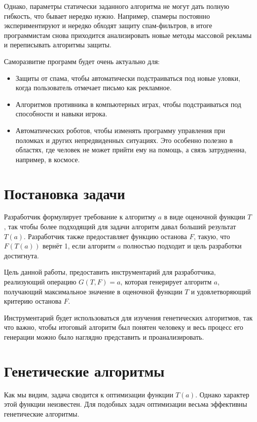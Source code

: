 \documentclass[a4paper,14pt]{extarticle}
\begin{document}
Однако, параметры статически заданного алгоритма не могут дать полную гибкость,
что бывает нередко нужно. Например, спамеры постоянно экспериментируют и нередко
обходят защиту спам-фильтров, в итоге программистам снова приходится
анализировать новые методы массовой рекламы и переписывать алгоритмы защиты.

Саморазвитие программ будет очень актуально для:
\begin{itemize}
  \item Защиты от спама, чтобы автоматически подстраиваться под новые уловки,
        когда пользователь отмечает письмо как рекламное.
  \item Алгоритмов противника в компьютерных играх, чтобы подстраиваться под
        способности и навыки игрока.
  \item Автоматических роботов, чтобы изменять программу управления при
        поломках и других непредвиденных ситуациях.\cite{damage} Это особенно
        полезно в областях, где человек не может прийти ему на помощь, а связь
        затрудненна, например, в космосе.
\end{itemize}

\section{Постановка задачи}
Разработчик формулирует требование к алгоритму $a$ в виде оценочной
функции $T$, так чтобы более подходящий для задачи алгоритм давал больший
результат $T(a)$. Разработчик также предоставляет функцию останова $F$, такую,
что $F(T(a))$ вернёт 1, если алгоритм $a$ полностью подходит и цель разработки
достигнута.

Цель данной работы, предоставить инструментарий для разработчика, реализующий
операцию $G(T, F) = a$, которая генерирует алгоритм $a$, получающий максимальное
значение в оценочной функции $T$ и удовлетворяющий критерию останова $F$.

Инструментарий будет использоваться для изучения генетических алгоритмов, так
что важно, чтобы итоговый алгоритм был понятен человеку и весь процесс его
генерации можно было наглядно представить и проанализировать.

\section{Генетические алгоритмы}
Как мы видим, задача сводится к оптимизации функции $T(a)$. Однако характер этой
функции неизвестен. Для подобных задач оптимизации весьма эффективны
генетические алгоритмы.\cite{reinforcement}
\end{document}
